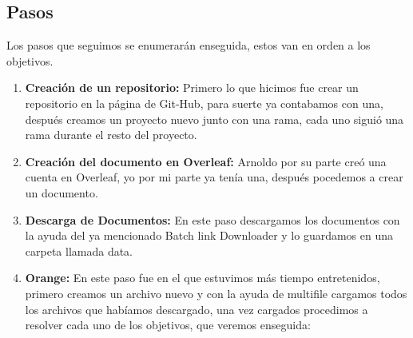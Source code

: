 \subsection*{Pasos}
Los pasos que seguimos se enumerarán enseguida, estos van en orden a los objetivos.
\begin{enumerate}[1.]
    \item{\bfseries Creación de un repositorio:} Primero lo que hicimos fue crear un repositorio en la página de Git-Hub, para suerte ya contabamos con una, después creamos un proyecto nuevo junto con una rama, cada uno siguió una rama durante el resto del proyecto.
    \item{\bfseries Creación del documento en Overleaf:} Arnoldo por su parte creó una cuenta en Overleaf, yo por mi parte ya tenía una, después pocedemos a crear un documento.
    \item{\bfseries Descarga de Documentos:} En este paso descargamos los documentos con la ayuda del ya mencionado Batch link Downloader y lo guardamos en una carpeta llamada data.
    \item{\bfseries Orange:} En este paso fue en el que estuvimos más tiempo entretenidos, primero creamos un archivo nuevo y con la ayuda de multifile cargamos todos los archivos que habíamos descargado, una vez cargados procedimos a resolver cada uno de los objetivos, que veremos enseguida:


\end{enumerate}
